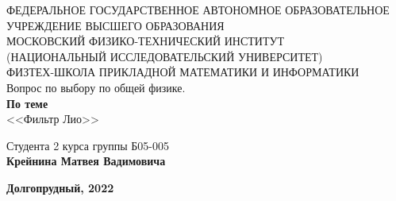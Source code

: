 


\large
\begin{center}
	\hfill \break
	\hfill \break
	{\small ФЕДЕРАЛЬНОЕ ГОСУДАРСТВЕННОЕ АВТОНОМНОЕ ОБРАЗОВАТЕЛЬНОЕ\\ УЧРЕЖДЕНИЕ ВЫСШЕГО ОБРАЗОВАНИЯ\\ МОСКОВСКИЙ ФИЗИКО-ТЕХНИЧЕСКИЙ ИНСТИТУТ\\ (НАЦИОНАЛЬНЫЙ ИССЛЕДОВАТЕЛЬСКИЙ УНИВЕРСИТЕТ)\\ ФИЗТЕХ-ШКОЛА ПРИКЛАДНОЙ МАТЕМАТИКИ И ИНФОРМАТИКИ}\\

	\hfill \break
	\normalsize{Вопрос по выбору по общей физике. }\\
	\vspace{7em}
	\normalsize{\textbf{По теме}}\\
	\vspace{7em}
	\large{<<Фильтр Лио>>}\\
\end{center}

\vspace{25em}
\begin{flushright}
	\normalsize{Студента 2 курса группы Б05-005}\\
	\normalsize{\textbf{Крейнина Матвея Вадимовича}}\\
\end{flushright}

\vspace{\fill}
\begin{center}
	\normalsize{\textbf{Долгопрудный, 2022}}
\end{center}


\thispagestyle{empty} %




\newpage
